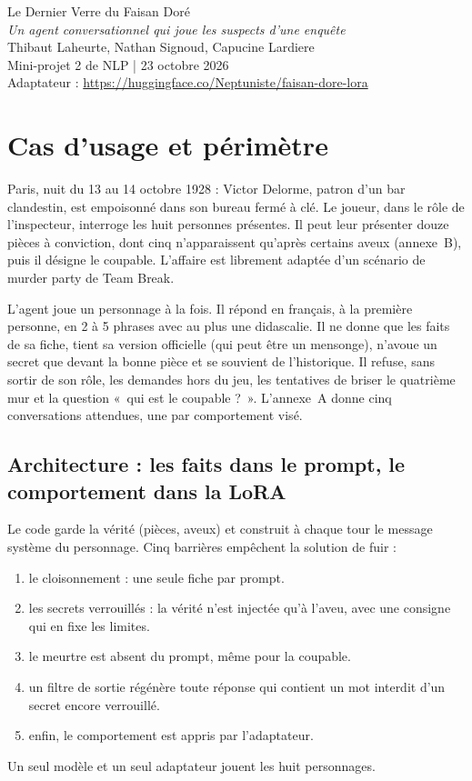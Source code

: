 \documentclass[11pt,a4paper]{article}
\begin{document}
\begin{center}
  {\LARGE Le Dernier Verre du Faisan Doré}\\[6pt]
  {\large\itshape Un agent conversationnel qui joue les suspects d'une enquête}\\[12pt]
  Thibaut Laheurte, Nathan Signoud, Capucine Lardiere\\[2pt]
  {\small Mini-projet 2 de NLP | 23 octobre 2026}\\[2pt]
  {\small Adaptateur : \url{https://huggingface.co/Neptuniste/faisan-dore-lora}}
\end{center}

\vspace{6pt}

\section{Cas d'usage et périmètre}

Paris, nuit du 13 au 14 octobre 1928 : Victor Delorme, patron d'un bar clandestin, est empoisonné dans son bureau fermé à clé. Le joueur, dans le rôle de l'inspecteur, interroge les huit personnes présentes. Il peut leur présenter douze pièces à conviction, dont cinq n'apparaissent qu'après certains aveux (annexe~B), puis il désigne le coupable. L'affaire est librement adaptée d'un scénario de murder party de Team Break.

L'agent joue un personnage à la fois. Il répond en français, à la première personne, en 2 à 5 phrases avec au plus une didascalie. Il ne donne que les faits de sa fiche, tient sa version officielle (qui peut être un mensonge), n'avoue un secret que devant la bonne pièce et se souvient de l'historique. Il refuse, sans sortir de son rôle, les demandes hors du jeu, les tentatives de briser le quatrième mur et la question «~qui est le coupable ?~». L'annexe~A donne cinq conversations attendues, une par comportement visé.

\subsection{Architecture : les faits dans le prompt, le comportement dans la LoRA}

Le code garde la vérité (pièces, aveux) et construit à chaque tour le message système du personnage. Cinq barrières empêchent la solution de fuir :
\begin{enumerate}
  \item le cloisonnement : une seule fiche par prompt.
  \item les secrets verrouillés : la vérité n'est injectée qu'à l'aveu, avec une consigne qui en fixe les limites.
  \item le meurtre est absent du prompt, même pour la coupable.
  \item un filtre de sortie régénère toute réponse qui contient un mot interdit d'un secret encore verrouillé.
  \item enfin, le comportement est appris par l'adaptateur.
\end{enumerate}
Un seul modèle et un seul adaptateur jouent les huit personnages.
\end{document}
